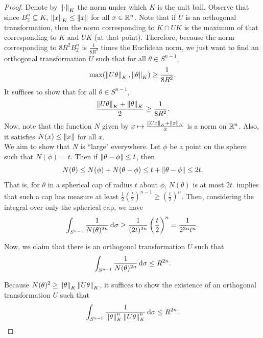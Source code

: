 \begin{proof}
Denote by $\left\lVert\cdot\right\rVert_K$ the norm under which $K$ is the unit ball. Observe that since $B_2^n\subseteq K$, $\left\lVert x\right\rVert_K\leq \left\lVert x\right\rVert$ for all $x\in\mathbb{R}^n$. Note that if $U$ is an orthogonal transformation, then the norm corresponding to $K\cap U K$ is the maximum of that corresponding to $K$ and $U K$ (at that point). Therefore, because the norm corresponding to $8R^2 B_2^n$ is $\frac{1}{8R^2}$ times the Euclidean norm, we just want to find an orthogonal transformation $U$ such that for all $\theta\in S^{n-1}$,
\[ \max(\left\lVert U\theta\right\rVert_K, \left\lVert\theta\right\rVert_K) \geq \frac{1}{8R^2}. \]
It suffices to show that for all $\theta\in S^{n-1}$,
\begin{equation}
\label{eqn kasin's theorem final aim}
    \frac{\left\lVert U\theta\right\rVert_K + \left\lVert\theta\right\rVert_K}{2} \geq \frac{1}{8R^2}.
\end{equation}
Now, note that the function $N$ given by $x\mapsto \frac{\left\lVert U x\right\rVert_K + \left\lVert x\right\rVert_K}{2}$ is a norm on $\mathbb{R}^n$. Also, it satisfies $N(x)\leq \left\lVert x\right\rVert$ for all $x$.\\
We aim to show that $N$ is ``large" everywhere. Let $\phi$ be a point on the sphere such that $N(\phi) = t$. Then if $\left\lVert\theta-\phi\right\rVert \leq t$, then
\[ N(\theta) \leq N(\phi) + N(\theta - \phi) \leq t + \left\lVert\theta-\phi\right\rVert \leq 2t. \]
That is, for $\theta$ in a spherical cap of radius $t$ about $\phi$, $N(\theta)$ is at most $2t$.  implies that such a cap has measure  at least $\frac{1}{2}\left(\frac{t}{2}\right)^{n-1} \geq \left(\frac{t}{2}\right)^{n}$. Then, considering the integral over only the spherical cap, we have
\begin{equation}
\label{eqn kasin theorem integral lower bound}
    \int_{S^{n-1}} \frac{1}{N(\theta)^{2n}} \operatorname{d}\!{\sigma} \geq \frac{1}{(2t)^{2n}}\left(\frac{t}{2}\right)^n = \frac{1}{2^{3n}t^n}.
\end{equation}

Now, we claim that there is an orthogonal transformation $U$ such that
\begin{equation}
\label{eqn kasin theorem integral upper bound}
    \int_{S^{n-1}} \frac{1}{N(\theta)^{2n}}\operatorname{d}\!{\sigma} \leq R^{2n}.
\end{equation}

Because $N(\theta)^2 \geq \left\lVert\theta\right\rVert_K \left\lVert U\theta\right\rVert_K $, it suffices to show the existence of an orthogonal transformation $U$ such that
\[ \int_{S^{n-1}} \frac{1}{\left\lVert\theta\right\rVert^n_K\left\lVert U\theta\right\rVert^n_K}\operatorname{d}\!{\sigma} \leq R^{2n}. \]


\end{proof}
